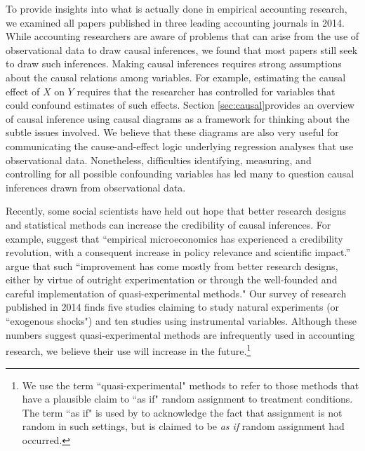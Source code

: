 \documentclass[12pt,reqno,titlepage]{amsart}
\theoremstyle{definition}
\begin{document}
\begin{doublespace}
To provide insights into what is actually done in empirical accounting research, we examined all papers published in three leading accounting journals in 2014. 
% 
While accounting researchers are aware of problems that can arise from the use of observational data to draw causal inferences, we found that most papers still seek to draw such inferences. 
Making causal inferences requires strong assumptions about the causal relations among variables.
For example, estimating the causal effect of $X$ on $Y$ requires that the researcher has controlled for variables that could confound estimates of such effects.
Section \ref{sec:causal}provides an overview of causal inference using causal diagrams as a framework for thinking about the subtle issues involved.
We believe that these diagrams are also very useful for communicating the cause-and-effect logic underlying regression analyses that use observational data.
Nonetheless, difficulties identifying, measuring, and controlling for all possible confounding variables has led many to question causal inferences drawn from observational data.

Recently, some social scientists have held out hope that better research designs and statistical methods can increase the credibility of causal inferences.
For example, \citet{Angrist:2010jv} suggest that ``empirical microeconomics has experienced a credibility revolution, with a consequent increase in policy relevance and scientific impact.''  
\citet[p.\,26]{Angrist:2010jv} argue that such ``improvement has come mostly from better research designs, either by virtue of outright experimentation or through the well-founded and careful implementation of quasi-experimental methods."
Our survey of research published in 2014 finds five studies claiming to study natural experiments (or ``exogenous shocks") and ten studies using instrumental variables.
Although these numbers suggest quasi-experimental methods are infrequently used in accounting research, we believe their use will increase in the future.\footnote{
We use the term ``quasi-experimental" methods to refer to those methods that have a plausible claim to ``as if" random assignment to treatment conditions.
The term ``as if" is used by \citet{Dunning:2012tt} to acknowledge the fact that assignment is not random in such settings, but is claimed to be \emph{as if} random assignment had occurred.}


\end{doublespace}
\end{document}
